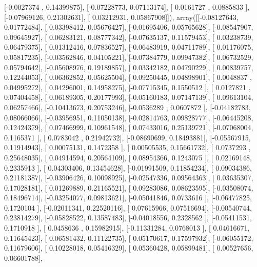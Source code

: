 \documentclass{article}
\begin{document}
       [-0.0027374 ,  0.14399875],
       [-0.07228773,  0.07113174],
       [ 0.0161727 ,  0.0885833 ],
       [-0.07969126,  0.21302631],
       [ 0.03212931,  0.05867908]]), array([[-0.08127643,  0.01772484],
       [ 0.03398412,  0.05676427],
       [-0.01695406,  0.05765628],
       [-0.08547907,  0.09645927],
       [ 0.06283121,  0.08777342],
       [-0.07635137,  0.11579453],
       [ 0.03238739,  0.06479375],
       [ 0.01312416,  0.07836527],
       [-0.06483919,  0.04711789],
       [ 0.01176075,  0.05817235],
       [-0.03562846,  0.04105221],
       [-0.07384779,  0.09947382],
       [ 0.06732529,  0.05794642],
       [-0.05608976,  0.19189857],
       [ 0.03342182,  0.04790229],
       [ 0.00839757,  0.12244053],
       [ 0.06362852,  0.05625504],
       [ 0.09250445,  0.04898901],
       [ 0.0048837 ,  0.04995272],
       [ 0.04296001,  0.14958275],
       [-0.07715345,  0.1550512 ],
       [ 0.0127821 ,  0.07404458],
       [ 0.06189305,  0.20177993],
       [-0.05160183,  0.07147139],
       [ 0.09613104,  0.06257466],
       [-0.10413673,  0.20753246],
       [-0.0536289 ,  0.0607872 ],
       [-0.04182783,  0.08066066],
       [-0.03956951,  0.11050138],
       [-0.02814763,  0.09828777],
       [-0.06445208,  0.12424379],
       [ 0.07466999,  0.10961548],
       [ 0.07433016,  0.25139721],
       [-0.07068004,  0.1165371 ],
       [ 0.0783042 ,  0.21942732],
       [-0.08690699,  0.18493881],
       [-0.05567915,  0.11914943],
       [ 0.00075131,  0.1472358 ],
       [ 0.00505535,  0.15661732],
       [ 0.0737293 ,  0.25648035],
       [ 0.04914594,  0.20564109],
       [ 0.08954366,  0.1243075 ],
       [ 0.02169148,  0.2335913 ],
       [ 0.04303406,  0.13454628],
       [-0.01991509,  0.11854234],
       [ 0.09034386,  0.21181387],
       [-0.03906426,  0.10098925],
       [-0.02547336,  0.09564363],
       [ 0.03635307,  0.17028181],
       [ 0.01269889,  0.21165521],
       [ 0.09283086,  0.08623595],
       [-0.03508074,  0.18496714],
       [-0.03254077,  0.09813621],
       [-0.05041846,  0.0733616 ],
       [-0.06477825,  0.1720104 ],
       [-0.02011341,  0.22520116],
       [ 0.07615966,  0.07516694],
       [-0.00540744,  0.23814279],
       [-0.05828522,  0.13587483],
       [-0.04018556,  0.2328562 ],
       [-0.05411531,  0.1710918 ],
       [ 0.0458636 ,  0.15982915],
       [-0.11331284,  0.0768013 ],
       [ 0.04616671,  0.11645423],
       [ 0.06581432,  0.11122735],
       [ 0.05170617,  0.17597932],
       [-0.06055172,  0.11679606],
       [ 0.10228018,  0.05416329],
       [ 0.05360428,  0.05899481],
       [ 0.00527656,  0.06601788],
\end{document}
